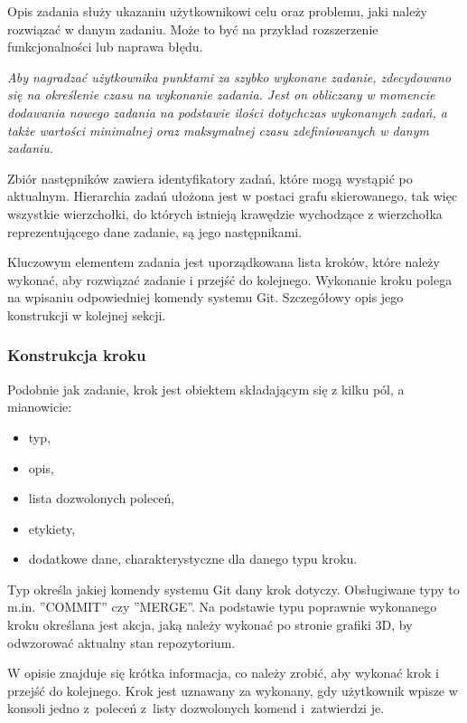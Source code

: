 \documentclass[11pt,a4paper,polish,thesis]{dcsbook}
\begin{document}
	Opis zadania służy ukazaniu użytkownikowi celu oraz problemu, jaki należy rozwiązać w danym zadaniu. Może to być na przykład rozszerzenie funkcjonalności lub naprawa błędu.
	
	\textit{Aby nagradzać użytkownika punktami za szybko wykonane zadanie, zdecydowano się na określenie czasu na wykonanie zadania. Jest on obliczany w momencie dodawania nowego zadania na podstawie ilości dotychczas wykonanych zadań, a także wartości minimalnej oraz maksymalnej czasu zdefiniowanych w danym zadaniu.}
	
	Zbiór następników zawiera identyfikatory zadań, które mogą wystąpić po aktualnym. Hierarchia zadań ułożona jest w postaci grafu skierowanego, tak więc wszystkie wierzchołki, do których istnieją krawędzie wychodzące z wierzchołka reprezentującego dane zadanie, są jego następnikami. 
	
	Kluczowym elementem zadania jest uporządkowana lista kroków, które należy wykonać, aby rozwiązać zadanie i przejść do kolejnego. Wykonanie kroku polega na wpisaniu odpowiedniej komendy systemu Git. Szczegółowy opis jego konstrukcji w kolejnej sekcji.

	
	\subsubsection{Konstrukcja kroku}
	
	Podobnie jak zadanie, krok jest obiektem składającym się z kilku pól, a mianowicie:
	\begin{itemize}
		\item typ,
		\item opis,
		\item lista dozwolonych poleceń,
		\item etykiety,
		\item dodatkowe dane, charakterystyczne dla danego typu kroku.	
	\end{itemize}

	Typ określa jakiej komendy systemu Git dany krok dotyczy. Obsługiwane typy to m.in. ''COMMIT'' czy ''MERGE''. Na podstawie typu poprawnie wykonanego kroku określana jest akcja, jaką należy wykonać po stronie grafiki 3D, by odwzorować aktualny stan repozytorium. 
	 
	W opisie znajduje się krótka informacja, co należy zrobić, aby wykonać krok i przejść do kolejnego. Krok jest uznawany za wykonany, gdy użytkownik wpisze w konsoli jedno z~poleceń z~listy dozwolonych komend i~zatwierdzi je.
	
\end{document}
